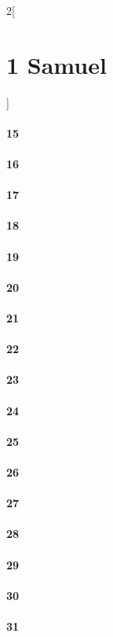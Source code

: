 \documentclass{book}
\begin{document}
\begin{multicols}{2}[\part{1 Samuel}]
\subsection*{15}
\subsection*{16}
\subsection*{17}
\subsection*{18}
\subsection*{19}
\subsection*{20}
\subsection*{21}
\subsection*{22}
\subsection*{23}
\subsection*{24}
\subsection*{25}
\subsection*{26}
\subsection*{27}
\subsection*{28}
\subsection*{29}
\subsection*{30}
\subsection*{31}
\end{multicols}
\end{document}

